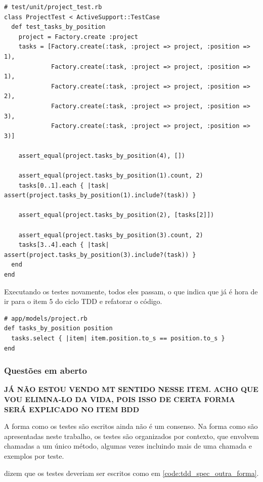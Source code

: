 \begin{lstlisting}[caption=Teste do método Project\#tasks\_by\_position (versão 3),label=code:tdd_spec3]
# test/unit/project_test.rb
class ProjectTest < ActiveSupport::TestCase
  def test_tasks_by_position
    project = Factory.create :project
    tasks = [Factory.create(:task, :project => project, :position => 1),
             Factory.create(:task, :project => project, :position => 1),
             Factory.create(:task, :project => project, :position => 2),
             Factory.create(:task, :project => project, :position => 3),
             Factory.create(:task, :project => project, :position => 3)]

    assert_equal(project.tasks_by_position(4), [])

    assert_equal(project.tasks_by_position(1).count, 2)
    tasks[0..1].each { |task| assert(project.tasks_by_position(1).include?(task)) }

    assert_equal(project.tasks_by_position(2), [tasks[2]])

    assert_equal(project.tasks_by_position(3).count, 2)
    tasks[3..4].each { |task| assert(project.tasks_by_position(3).include?(task)) }
  end
end
\end{lstlisting}

Executando os testes novamente, todos eles passam, o que indica que já é hora de ir para o item 5 do ciclo TDD e refatorar o código.

\begin{lstlisting}[caption=Código do método Project\#tasks\_by\_position (versão 3),label=code:tdd_code3]
# app/models/project.rb
def tasks_by_position position
  tasks.select { |item| item.position.to_s == position.to_s }
end
\end{lstlisting}

\subsubsection{Questões em aberto}
\label{ssub:tdd_em_averto}

\textbf{JÁ NÃO ESTOU VENDO MT SENTIDO NESSE ITEM. ACHO QUE VOU ELIMNA-LO DA VIDA, POIS ISSO DE CERTA FORMA SERÁ EXPLICADO NO ITEM BDD}

A forma como os testes são escritos ainda não é um consenso. Na forma como são apresentadas neste trabalho, os testes são organizados por contexto, que envolvem chamadas a um único método, algumas vezes incluindo mais de uma chamada e exemplos por teste.

 dizem que os testes deveriam ser escritos como em \ref{code:tdd_spec_outra_forma}.

